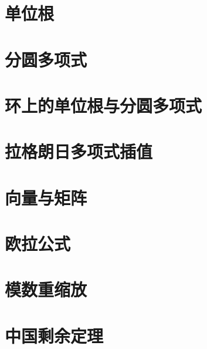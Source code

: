 \documentclass[11pt]{article}
\begin{document}
\clearpage

\section{单位根}
\label{sec:roots}


\clearpage

\section{分圆多项式}
\label{sec:cyclotomic}


\clearpage

\section{环上的单位根与分圆多项式}
\label{sec:cyclotomic-polynomial-integer-ring}


\clearpage

\section{拉格朗日多项式插值}
\label{sec:polynomial-interpolation}


\clearpage

\section{向量与矩阵}
\label{sec:matrix}


\clearpage

\section{欧拉公式}
\label{sec:euler}


\clearpage

\section{模数重缩放}
\label{sec:modulus-rescaling}


\clearpage

\section{中国剩余定理}
\label{sec:chinese-remainder}

\end{document}
